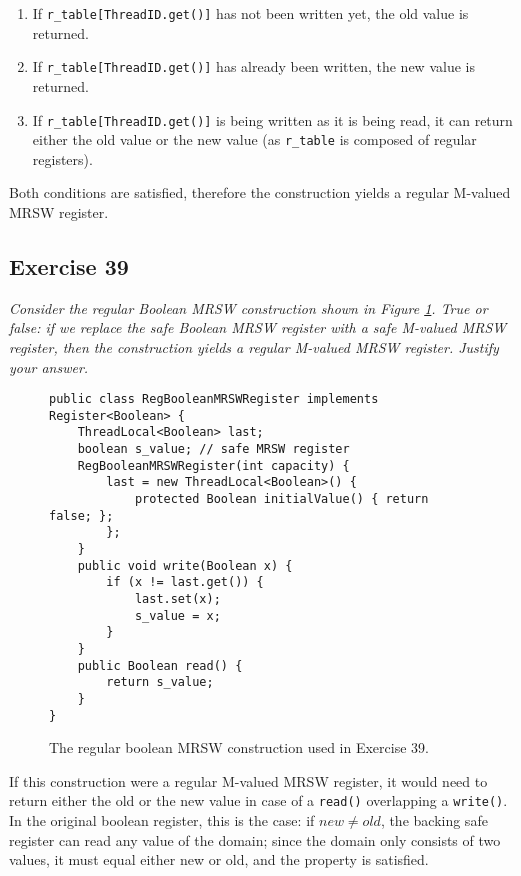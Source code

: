 \documentclass[a4paper,10pt]{article}
\begin{document}
\begin{enumerate}
\item If \lstinline|r_table[ThreadID.get()]| has not been written yet, the old value
      is returned.
\item If \lstinline|r_table[ThreadID.get()]| has already been written, the new value
      is returned.
\item If \lstinline|r_table[ThreadID.get()]| is being written as it is being read,
      it can return either the old value or the new value (as \lstinline|r_table|
      is composed of regular registers).
\end{enumerate}

Both conditions are satisfied, therefore the construction yields a regular M-valued MRSW
register.


\subsection{Exercise 39}

\emph{Consider the regular Boolean MRSW construction shown in Figure \ref{fig:regularbooleanmrsw}.
True or false: if we replace the safe Boolean MRSW register with a safe M-valued
MRSW register, then the construction yields a regular M-valued MRSW register.
Justify your answer.}

\vspace{3mm}

\begin{figure}
\begin{lstlisting}
public class RegBooleanMRSWRegister implements Register<Boolean> {
    ThreadLocal<Boolean> last;
    boolean s_value; // safe MRSW register
    RegBooleanMRSWRegister(int capacity) {
        last = new ThreadLocal<Boolean>() {
            protected Boolean initialValue() { return false; };
        };
    }
    public void write(Boolean x) {
        if (x != last.get()) {
            last.set(x);
            s_value = x;
        }
    }
    public Boolean read() {
        return s_value;
    }
}
\end{lstlisting}
\caption{The regular boolean MRSW construction used in Exercise 39.}
\label{fig:regularbooleanmrsw}
\end{figure}

If this construction were a regular M-valued MRSW register, it would need
to return either the old or the new value in case of a \lstinline|read()| overlapping
a \lstinline|write()|. In the original boolean register, this is the case: if $new \neq old$,
the backing safe register can read any value of the domain; since the domain only
consists of two values, it must equal either new or old, and the property is satisfied.
\end{document}
